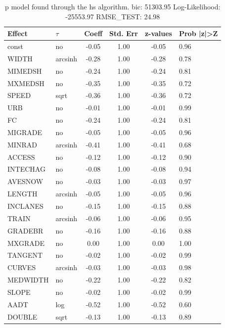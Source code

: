 \begin{table}
	\caption{p model found through the hs algorithm. bic: 51303.95 Log-Likelihood: -25553.97 RMSE_TEST: 24.98}
	\begin{center}
		\begin{tabular}{|l|l|c|c|c|l|}
			\hline
			Effect & $\tau$ & Coeff & Std. Err & z-values & Prob |z|>Z \\
			\hline
			const & no & -0.05 & 1.00 & -0.05 & 0.96 \\
			\hline
			WIDTH & arcsinh & -0.28 & 1.00 & -0.28 & 0.78 \\
			\hline
			MIMEDSH & no & -0.24 & 1.00 & -0.24 & 0.81 \\
			\hline
			MXMEDSH & no & -0.35 & 1.00 & -0.35 & 0.72 \\
			\hline
			SPEED & sqrt & -0.36 & 1.00 & -0.36 & 0.72 \\
			\hline
			URB & no & -0.01 & 1.00 & -0.01 & 0.99 \\
			\hline
			FC & no & -0.24 & 1.00 & -0.24 & 0.81 \\
			\hline
			MIGRADE & no & -0.05 & 1.00 & -0.05 & 0.96 \\
			\hline
			MINRAD & arcsinh & -0.41 & 1.00 & -0.41 & 0.68 \\
			\hline
			ACCESS & no & -0.12 & 1.00 & -0.12 & 0.90 \\
			\hline
			INTECHAG & no & -0.08 & 1.00 & -0.08 & 0.94 \\
			\hline
			AVESNOW & no & -0.03 & 1.00 & -0.03 & 0.97 \\
			\hline
			LENGTH & arcsinh & -0.05 & 1.00 & -0.05 & 0.96 \\
			\hline
			INCLANES & no & -0.15 & 1.00 & -0.15 & 0.88 \\
			\hline
			TRAIN & arcsinh & -0.06 & 1.00 & -0.06 & 0.95 \\
			\hline
			GRADEBR & no & -0.16 & 1.00 & -0.16 & 0.88 \\
			\hline
			MXGRADE & no & 0.00 & 1.00 & 0.00 & 1.00 \\
			\hline
			TANGENT & no & -0.02 & 1.00 & -0.02 & 0.99 \\
			\hline
			CURVES & arcsinh & -0.03 & 1.00 & -0.03 & 0.98 \\
			\hline
			MEDWIDTH & no & -0.22 & 1.00 & -0.22 & 0.82 \\
			\hline
			SLOPE & no & -0.02 & 1.00 & -0.02 & 0.99 \\
			\hline
			AADT & log & -0.52 & 1.00 & -0.52 & 0.60 \\
			\hline
			DOUBLE & sqrt & -0.13 & 1.00 & -0.13 & 0.89 \\

\end{tabular}
\end{center}
\end{table}
